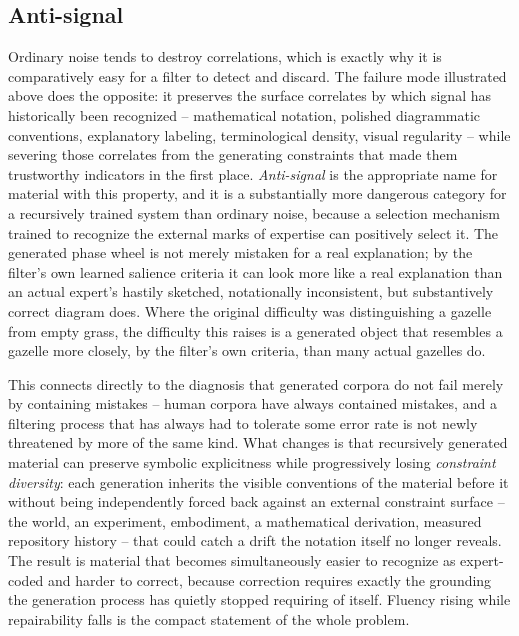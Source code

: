 \documentclass[11pt]{article}
\begin{document}
\subsection{Anti-signal}

Ordinary noise tends to destroy correlations, which is exactly why it is comparatively easy for a filter to detect and discard. The failure mode illustrated above does the opposite: it preserves the surface correlates by which signal has historically been recognized -- mathematical notation, polished diagrammatic conventions, explanatory labeling, terminological density, visual regularity -- while severing those correlates from the generating constraints that made them trustworthy indicators in the first place. \emph{Anti-signal} is the appropriate name for material with this property, and it is a substantially more dangerous category for a recursively trained system than ordinary noise, because a selection mechanism trained to recognize the external marks of expertise can positively select it. The generated phase wheel is not merely mistaken for a real explanation; by the filter's own learned salience criteria it can look more like a real explanation than an actual expert's hastily sketched, notationally inconsistent, but substantively correct diagram does. Where the original difficulty was distinguishing a gazelle from empty grass, the difficulty this raises is a generated object that resembles a gazelle more closely, by the filter's own criteria, than many actual gazelles do.

This connects directly to the diagnosis that generated corpora do not fail merely by containing mistakes -- human corpora have always contained mistakes, and a filtering process that has always had to tolerate some error rate is not newly threatened by more of the same kind. What changes is that recursively generated material can preserve symbolic explicitness while progressively losing \emph{constraint diversity}: each generation inherits the visible conventions of the material before it without being independently forced back against an external constraint surface -- the world, an experiment, embodiment, a mathematical derivation, measured repository history -- that could catch a drift the notation itself no longer reveals. The result is material that becomes simultaneously easier to recognize as expert-coded and harder to correct, because correction requires exactly the grounding the generation process has quietly stopped requiring of itself. Fluency rising while repairability falls is the compact statement of the whole problem.
\end{document}
